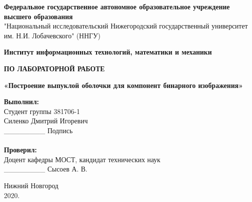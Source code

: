 \documentclass{report}
\begin{document}
\begin{titlepage}

\begin{center}
\textbf{Федеральное государственное автономное образовательное учреждение высшего образования} \\
"Национальный исследовательский Нижегородский государственный университет им. Н.И. Лобачевского" (ННГУ)
\end{center}

\begin{center}
\textbf{Институт информационных технологий, математики и механики}
\end{center}

\vspace{5em}

\begin{center}
\textbf{ ПО ЛАБОРАТОРНОЙ РАБОТЕ} \\
\end{center}
\begin{center}
\textbf{\Large«Построение выпуклой оболочки для компонент бинарного изображения»} \\
\end{center}

\vspace{6em}

\newbox{\lbox}
\newlength{\maxl}
\setlength{\maxl}{\wd\lbox}
\hfill\parbox{8cm}{
\hspace*{5cm}\hspace*{-5cm}\textbf{Выполнил:} \\ Студент группы 381706-1 \\ Силенко Дмитрий Игоревич\\  \_\_\_\_\_\_\_\_ Подпись
\\ \\
\hspace*{5cm}\hspace*{-5cm}\textbf{Проверил:}\\ Доцент кафедры МОСТ, кандидат технических наук \\ \_\_\_\_\_\_\_\_ Сысоев А. В.
}

\vspace{\fill}

\begin{center} Нижний Новгород \\ 2020. \end{center}

\end{titlepage}
\end{document}
